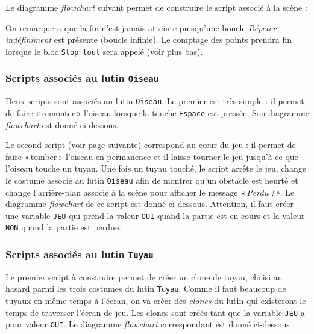 Le diagramme \emph{flowchart} suivant permet de construire le script associé à la scène :



On remarquera que la fin n'est jamais atteinte puisqu'une boucle \emph{Répéter indéfiniment} est présente (boucle infinie). Le comptage des points prendra fin lorsque le bloc \texttt{Stop tout} sera appelé (voir plus bas).





\subsubsection{Scripts associés au lutin \texttt{Oiseau}}

Deux scripts sont associés au lutin \texttt{Oiseau}. Le premier est très simple : il permet de faire «\,remonter\,» l'oiseau lorsque la touche \texttt{Espace} est pressée. Son diagramme \emph{flowchart} est donné ci-dessous.


\vspace{3cm}

Le second script (voir page suivante) correspond au cœur du jeu : il permet de faire «\,tomber\,» l'oiseau en permanence et il laisse tourner le jeu jusqu'à ce que l'oiseau touche un tuyau. Une fois un tuyau touché, le script arrête le jeu, change le costume associé au lutin \texttt{Oiseau} afin de montrer qu'un obstacle est heurté et change l'arrière-plan associé à la scène pour afficher le message \emph{«\,Perdu !\,»}. Le diagramme \emph{flowchart} de ce script est donné ci-dessous. Attention, il faut créer une variable \texttt{JEU} qui prend la valeur \texttt{OUI} quand la partie est en cours et la valeur \texttt{NON} quand la partie est perdue.

\newpage 



\subsubsection{Scripts associés au lutin \texttt{Tuyau}}

Le premier script à construire permet de créer un clone de tuyau, choisi au hasard parmi les trois costumes du lutin \texttt{Tuyau}. Comme il faut beaucoup de tuyaux en même temps à l'écran, on va créer des \emph{clones} du lutin qui existeront le temps de traverser l'écran de jeu. Les clones sont créés tant que la variable \texttt{JEU} a pour valeur \texttt{OUI}. Le diagramme \emph{flowchart} correspondant est donné ci-dessous :

